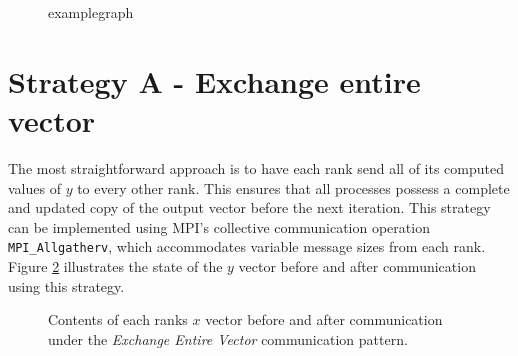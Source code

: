 


\begin{figure}[ht]
    \centering
    \caption{examplegraph}
    \label{fig:examplegraph}
\end{figure}

\section{Strategy A - Exchange entire vector}


The most straightforward approach is to have each rank send all of its computed values of 
\(y\) to every other rank. This ensures that all processes possess a complete and updated copy of the output vector before the next iteration. This strategy can be implemented using MPI’s collective communication operation \texttt{MPI\_Allgatherv}, which accommodates variable message sizes from each rank. Figure \ref{fig:1acomm} illustrates the state of the \(y\) vector before and after communication using this strategy.



\begin{figure}[ht]
    \centering
    \caption{Contents of each ranks \(x\) vector before and after communication under the \textit{Exchange Entire Vector} communication pattern.}
    \label{fig:1acomm}
\end{figure}


